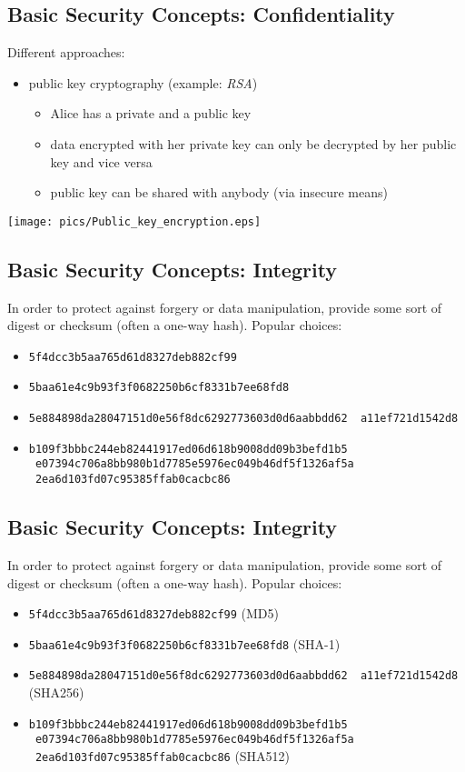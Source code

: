 \documentclass[xga]{xdvislides}
\begin{document}
\subsection{Basic Security Concepts: Confidentiality}
Different approaches:
\begin{itemize}
	\item public key cryptography (example: {\em RSA})
		\begin{itemize}
			\item Alice has a private and a public key
			\item data encrypted with her private key can only be decrypted by
				her public key and vice versa
			\item public key can be shared with anybody (via insecure means)
		\end{itemize}
\end{itemize}
\begin{center}
	\texttt{[image: pics/Public\_key\_encryption.eps]}
 \end{center}

\subsection{Basic Security Concepts: Integrity}
In order to protect against forgery or data manipulation, provide some sort of
digest or checksum (often a one-way hash).  Popular choices:

\begin{itemize}
	\item {\tt 5f4dcc3b5aa765d61d8327deb882cf99}
	\item {\tt 5baa61e4c9b93f3f0682250b6cf8331b7ee68fd8}
	\item {\tt 5e884898da28047151d0e56f8dc6292773603d0d6aabbdd62 \
                   a11ef721d1542d8}
	\item {\tt b109f3bbbc244eb82441917ed06d618b9008dd09b3befd1b5 \
                   e07394c706a8bb980b1d7785e5976ec049b46df5f1326af5a \
                   2ea6d103fd07c95385ffab0cacbc86}
\end{itemize}

\subsection{Basic Security Concepts: Integrity}
In order to protect against forgery or data manipulation, provide some sort of
digest or checksum (often a one-way hash).  Popular choices:

\begin{itemize}
	\item {\tt 5f4dcc3b5aa765d61d8327deb882cf99} (MD5)
	\item {\tt 5baa61e4c9b93f3f0682250b6cf8331b7ee68fd8} (SHA-1)
	\item {\tt 5e884898da28047151d0e56f8dc6292773603d0d6aabbdd62 \
                   a11ef721d1542d8} (SHA256)
	\item {\tt b109f3bbbc244eb82441917ed06d618b9008dd09b3befd1b5 \
                   e07394c706a8bb980b1d7785e5976ec049b46df5f1326af5a \
                   2ea6d103fd07c95385ffab0cacbc86} (SHA512)
\end{itemize}
\end{document}
